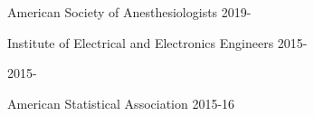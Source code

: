 

\begin{cvaffils}

    \cvaffil
    {American Society of Anesthesiologists} %
    {2019-} %
    
        \cvaffil
    {Institute of Electrical and Electronics Engineers} %
    {2015-} %
    
    {2015-}
    
        \cvaffil
    {American Statistical Association} %
    {2015-16} %

\end{cvaffils}
